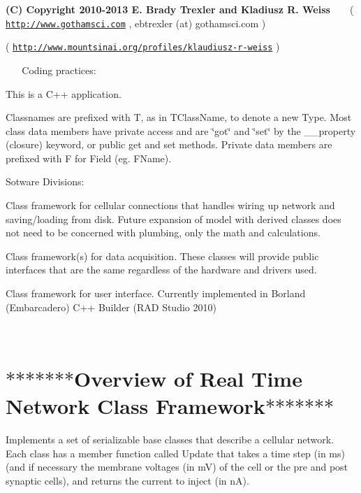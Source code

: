 {\bfseries  (C) Copyright 2010-\/2013 E. Brady Trexler and Kladiusz R. Weiss} ~\newline
~\newline
 ( \href{http://www.gothamsci.com}{\tt http\+://www.\+gothamsci.\+com} , ebtrexler (at) gothamsci.\+com )

( \href{http://www.mountsinai.org/profiles/klaudiusz-r-weiss}{\tt http\+://www.\+mountsinai.\+org/profiles/klaudiusz-\/r-\/weiss} )

~\newline
~\newline
 Coding practices\+:

This is a C++ application.

Classnames are prefixed with T, as in T\+Class\+Name, to denote a new Type. Most class data members have private access and are \char`\"{}got\char`\"{} and \char`\"{}set\char`\"{} by the \+\_\+\+\_\+property (closure) keyword, or public get and set methods. Private data members are prefixed with F for Field (eg. F\+Name).

Sotware Divisions\+:
\begin{DoxyEnumerate}
\item Class framework for cellular connections that handles wiring up network and saving/loading from disk. Future expansion of model with derived classes does not need to be concerned with plumbing, only the math and calculations.
\item Class framework(s) for data acquisition. These classes will provide public interfaces that are the same regardless of the hardware and drivers used.
\item Class framework for user interface. Currently implemented in Borland (Embarcadero) C++ Builder (R\+A\+D Studio 2010)
\end{DoxyEnumerate}

~\newline
~\newline
 \hypertarget{index_RTFramework}{}\section{$\ast$$\ast$$\ast$$\ast$$\ast$$\ast$$\ast$\+Overview of Real Time Network Class Framework$\ast$$\ast$$\ast$$\ast$$\ast$$\ast$$\ast$}\label{index_RTFramework}
Implements a set of serializable base classes that describe a cellular network. Each class has a member function called Update that takes a time step (in ms) (and if necessary the membrane voltages (in m\+V) of the cell or the pre and post synaptic cells), and returns the current to inject (in n\+A).

